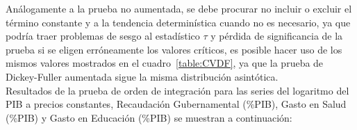 Análogamente a la prueba no aumentada, se debe procurar no incluir o excluir el término constante y a la tendencia determinística cuando no es necesario, ya que podría traer problemas de sesgo al estadístico $\tau$ y pérdida de significancia de la prueba si se eligen erróneamente los valores críticos, es posible hacer uso de los mismos valores mostrados en el cuadro~\ref{table:CVDF}, ya que la prueba de Dickey-Fuller aumentada sigue la misma distribución asintótica.  \\


Resultados de la prueba de orden de integración para las series del logaritmo del PIB a precios constantes, Recaudación Gubernamental (\%PIB), Gasto en Salud (\%PIB) y Gasto en Educación (\%PIB) se muestran a continuación:



